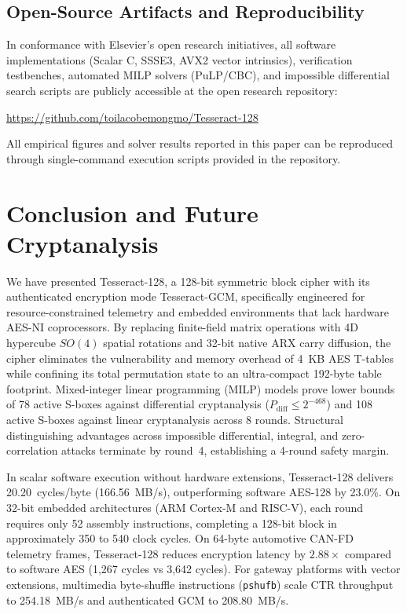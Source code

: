 \documentclass[review,12pt]{elsarticle}
\begin{document}
\subsection{Open-Source Artifacts and Reproducibility}
In conformance with Elsevier's open research initiatives, all software implementations (Scalar C, SSSE3, AVX2 vector intrinsics), verification testbenches, automated MILP solvers (PuLP/CBC), and impossible differential search scripts are publicly accessible at the open research repository:
\begin{center}
    \url{https://github.com/toilacobemongmo/Tesseract-128}
\end{center}
All empirical figures and solver results reported in this paper can be reproduced through single-command execution scripts provided in the repository.

\section{Conclusion and Future Cryptanalysis}
\label{sec:conclusion}
We have presented Tesseract-128, a 128-bit symmetric block cipher with its authenticated encryption mode Tesseract-GCM, specifically engineered for resource-constrained telemetry and embedded environments that lack hardware AES-NI coprocessors. By replacing finite-field matrix operations with 4D hypercube $SO(4)$ spatial rotations and 32-bit native ARX carry diffusion, the cipher eliminates the vulnerability and memory overhead of 4~KB AES T-tables while confining its total permutation state to an ultra-compact 192-byte table footprint. Mixed-integer linear programming (MILP) models prove lower bounds of 78 active S-boxes against differential cryptanalysis ($P_{\text{diff}} \le 2^{-468}$) and 108 active S-boxes against linear cryptanalysis across 8 rounds. Structural distinguishing advantages across impossible differential, integral, and zero-correlation attacks terminate by round~4, establishing a 4-round safety margin.

In scalar software execution without hardware extensions, Tesseract-128 delivers 20.20~cycles/byte (166.56~MB/s), outperforming software AES-128 by 23.0\%. On 32-bit embedded architectures (ARM Cortex-M and RISC-V), each round requires only 52 assembly instructions, completing a 128-bit block in approximately 350 to 540 clock cycles. On 64-byte automotive CAN-FD telemetry frames, Tesseract-128 reduces encryption latency by $2.88\times$ compared to software AES (1,267 cycles vs 3,642 cycles). For gateway platforms with vector extensions, multimedia byte-shuffle instructions (\texttt{pshufb}) scale CTR throughput to 254.18~MB/s and authenticated GCM to 208.80~MB/s.
\end{document}
